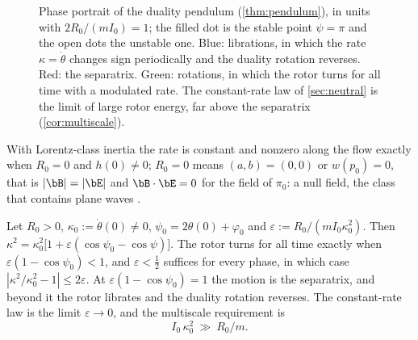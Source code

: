 \begin{figure}[t]
\centering
{}
\caption{Phase portrait of the duality pendulum (\cref{thm:pendulum}), in units with $2R_0/(mI_0)=1$; the filled dot is the stable point
$\psi=\pi$ and the open dots the unstable one. Blue: librations, in which the rate $\kappa=\dot\theta$ changes sign periodically and the duality
rotation reverses. Red: the separatrix. Green: rotations, in which the rotor turns for all time with a modulated rate. The constant-rate law of \cref{sec:neutral} is the limit of large rotor energy, far above the
separatrix (\cref{cor:multiscale}).}
\label{fig:pendulum}
\end{figure}

\begin{corollary}
\label{cor:constrate}
With Lorentz-class inertia the rate is constant and nonzero along the flow exactly when $R_0=0$ and $h(0)\neq0$; $R_0=0$ means $(a,b)=(0,0)$ or
$w(p_0)=0$, that is $|\bB|=|\bE|$ and $\bB\cdot\bE=0$ for the field of $\pi_0$: a null field, the class that contains plane waves
\cite{Synge56,Robinson61}.
\end{corollary}

\begin{corollary}
\label{cor:multiscale}
Let $R_0>0$, $\kappa_0:=\dot\theta(0)\neq0$, $\psi_0=2\theta(0)+\varphi_0$ and $\varepsilon:=R_0/(mI_0\kappa_0^2)$. Then
$\kappa^2=\kappa_0^2\bigl[1+\varepsilon(\cos\psi_0-\cos\psi)\bigr]$. The rotor turns for all time exactly when $\varepsilon(1-\cos\psi_0)<1$, and $\varepsilon<\tfrac12$
suffices for every phase, in which case $|\kappa^2/\kappa_0^2-1|\le2\varepsilon$. At $\varepsilon(1-\cos\psi_0)=1$ the motion is the separatrix, and beyond it
the rotor librates and the duality rotation reverses. The constant-rate law is the limit $\varepsilon\to0$, and the multiscale requirement is
\begin{equation}
\label{eq:multiscale}
I_0\,\kappa_0^2\ \gg\ R_0/m .
\end{equation}
\end{corollary}

